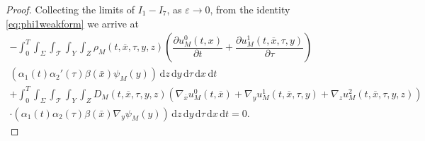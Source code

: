 \documentclass[10pt,a4paper]{amsart}
\def\T{\mathcal{T}}
\newcommand{\di}[1]{\,\mathrm{d}#1}
\def\es{\varepsilon}
\def\p{\partial}
\begin{document}
\begin{proof}
Collecting the limits of $I_1-I_7$, as $\es\rightarrow 0$, from the identity \eqref{eq:phi1weakform} we arrive at
\begin{multline*}
     -\int_0^T\int_{\Sigma}\int_\T\int_{Y}\int_Z  {\rho_M(t,\overline{x},\tau,y,z)} \left(\dfrac{\partial u_M^0(t,x)}{\partial t}+ \dfrac{\partial u_M^1(t,\overline{x},\tau,y)}{\partial \tau}\right) \\ ( \alpha_1(t)\alpha_2'(\tau)\beta(\bar x) \psi_M(y))\di{z}\di{y}\di{\tau}\di{x}\di{t}\\
     +\int_0^T\int_{\Sigma}\int_\T\int_{Y}\int_Z   D_M(t,\overline{x},\tau,y,z)
    \left( \nabla_{\overline{x}}u_M^0(t,\overline{x})+\nabla_y u_M^1(t,\overline{x},\tau,y)+\nabla_zu_M^2(t,\overline{x},\tau,y,z)\right)\\
    \cdot ( \alpha_1(t)\alpha_2(\tau)\beta(\bar x) \nabla_y\psi_M(y)) \di{z}\di{y}\di{\tau}\di{x}\di{t}=0.
\end{multline*}


\end{proof}
\end{document}
